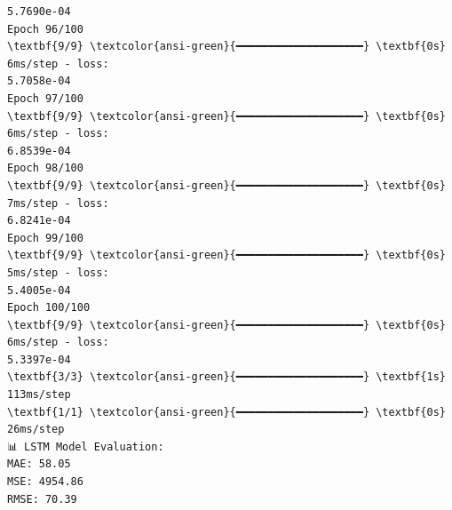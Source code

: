 \documentclass[11pt]{article}
\begin{document}
\begin{Verbatim}[commandchars=\\\{\}]
5.7690e-04
Epoch 96/100
\textbf{9/9} \textcolor{ansi-green}{━━━━━━━━━━━━━━━━━━━━} \textbf{0s} 6ms/step - loss:
5.7058e-04
Epoch 97/100
\textbf{9/9} \textcolor{ansi-green}{━━━━━━━━━━━━━━━━━━━━} \textbf{0s} 6ms/step - loss:
6.8539e-04
Epoch 98/100
\textbf{9/9} \textcolor{ansi-green}{━━━━━━━━━━━━━━━━━━━━} \textbf{0s} 7ms/step - loss:
6.8241e-04
Epoch 99/100
\textbf{9/9} \textcolor{ansi-green}{━━━━━━━━━━━━━━━━━━━━} \textbf{0s} 5ms/step - loss:
5.4005e-04
Epoch 100/100
\textbf{9/9} \textcolor{ansi-green}{━━━━━━━━━━━━━━━━━━━━} \textbf{0s} 6ms/step - loss:
5.3397e-04
\textbf{3/3} \textcolor{ansi-green}{━━━━━━━━━━━━━━━━━━━━} \textbf{1s} 113ms/step
\textbf{1/1} \textcolor{ansi-green}{━━━━━━━━━━━━━━━━━━━━} \textbf{0s} 26ms/step
📊 LSTM Model Evaluation:
MAE: 58.05
MSE: 4954.86
RMSE: 70.39
    \end{Verbatim}

    \begin{center}
    \end{center}
    { \hspace*{\fill} \\}
    
\end{document}
